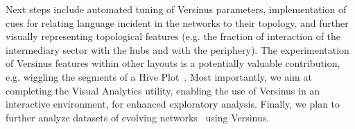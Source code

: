 \documentclass[runningheads]{llncs}
\begin{document}
Next steps include
automated tuning of Versinus parameters, 
implementation of cues for relating language incident in the networks to their topology, and
further visually representing topological features (e.g. the fraction of interaction of the intermediary sector with the hubs and with the periphery).
The experimentation of Versinus features within other layouts is a potentially
valuable contribution, e.g. wiggling the segments of a Hive Plot~\cite{hive}.
Most importantly, we aim at completing the Visual Analytics utility,
enabling the use of Versinus in an interactive environment, for enhanced exploratory analysis.
Finally, we plan to further analyze datasets of evolving networks~\cite{stab} using Versinus.


%
%
%


%
% 
% 
% 
% 
\end{document}
